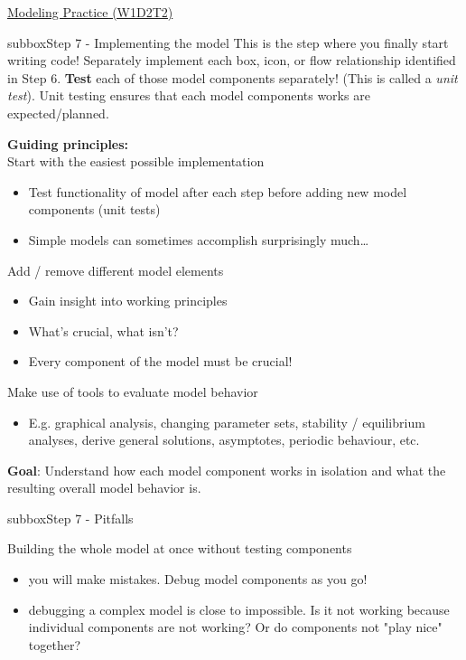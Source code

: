 \begin{textbox}{\href{https://compneuro.neuromatch.io/tutorials/W1D2_ModelingPractice/W1D2_Intro.html}{Modeling Practice  (W1D2T2)} }

\begin{subbox}{subbox}{Step 7 - Implementing the model
}
\scriptsize
This is the step where you finally start writing code! Separately implement each box, icon, or flow relationship identified in Step 6. \textbf{Test} each of those model components separately! (This is called a \textit{unit test}). Unit testing ensures that each model components works are expected/planned. 

\textbf{Guiding principles:}\\
Start with the easiest possible implementation
\begin{itemize}
    \item 
   Test functionality of model after each step before adding new model components (unit tests)
   \item Simple models can sometimes accomplish surprisingly much…
  \end{itemize}

 Add / remove different model elements
\begin{itemize}
    \item Gain insight into working principles
    \item What’s crucial, what isn’t?
    \item Every component of the model must be crucial!
  \end{itemize}

 Make use of tools to evaluate model behavior
  \begin{itemize}
    \item E.g. graphical analysis, changing parameter sets, stability / equilibrium analyses, derive general solutions, asymptotes, periodic behaviour, etc.
\end{itemize}


\textbf{Goal}: Understand how each model component works in isolation and what the resulting overall model behavior is.

  \end{subbox}
\begin{subbox}{subbox}{Step 7 - Pitfalls }
\scriptsize

Building the whole model at once without testing components
  \begin{itemize}
    \item you will make mistakes. Debug model components as you go!
   \item debugging a complex model is close to impossible. Is it not working because individual components are not working? Or do components not "play nice" together?\end{itemize}



\end{subbox}
\end{textbox}
